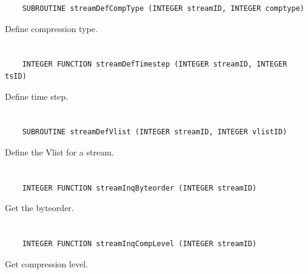 \begin{verbatim}
    SUBROUTINE streamDefCompType (INTEGER streamID, INTEGER comptype)
\end{verbatim}

Define compression type.


\section*{\tt {}}

\begin{verbatim}
    INTEGER FUNCTION streamDefTimestep (INTEGER streamID, INTEGER tsID)
\end{verbatim}

Define time step.


\section*{\tt {}}

\begin{verbatim}
    SUBROUTINE streamDefVlist (INTEGER streamID, INTEGER vlistID)
\end{verbatim}

Define the Vlist for a stream.


\section*{\tt {}}

\begin{verbatim}
    INTEGER FUNCTION streamInqByteorder (INTEGER streamID)
\end{verbatim}

Get the byteorder.


\section*{\tt {}}

\begin{verbatim}
    INTEGER FUNCTION streamInqCompLevel (INTEGER streamID)
\end{verbatim}

Get compression level.


\section*{\tt {}}

